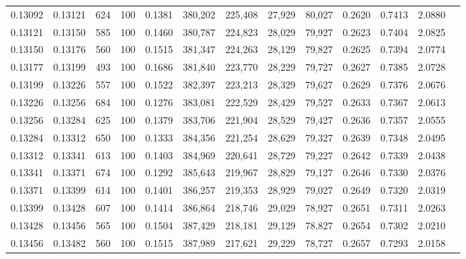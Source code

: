 \begin{tabular}{rrrrrrrrrrrrr}
0.13092 & 0.13121 &   624 & 100 &                                     0.1381 & 380,202 & 225,408 &  27,929 &  80,027 & 0.2620 & 0.7413 & 2.0880 \\
0.13121 & 0.13150 &   585 & 100 &                                     0.1460 & 380,787 & 224,823 &  28,029 &  79,927 & 0.2623 & 0.7404 & 2.0825 \\
0.13150 & 0.13176 &   560 & 100 &                                     0.1515 & 381,347 & 224,263 &  28,129 &  79,827 & 0.2625 & 0.7394 & 2.0774 \\
0.13177 & 0.13199 &   493 & 100 &                                     0.1686 & 381,840 & 223,770 &  28,229 &  79,727 & 0.2627 & 0.7385 & 2.0728 \\
0.13199 & 0.13226 &   557 & 100 &                                     0.1522 & 382,397 & 223,213 &  28,329 &  79,627 & 0.2629 & 0.7376 & 2.0676 \\
0.13226 & 0.13256 &   684 & 100 &                                     0.1276 & 383,081 & 222,529 &  28,429 &  79,527 & 0.2633 & 0.7367 & 2.0613 \\
0.13256 & 0.13284 &   625 & 100 &                                     0.1379 & 383,706 & 221,904 &  28,529 &  79,427 & 0.2636 & 0.7357 & 2.0555 \\
0.13284 & 0.13312 &   650 & 100 &                                     0.1333 & 384,356 & 221,254 &  28,629 &  79,327 & 0.2639 & 0.7348 & 2.0495 \\
0.13312 & 0.13341 &   613 & 100 &                                     0.1403 & 384,969 & 220,641 &  28,729 &  79,227 & 0.2642 & 0.7339 & 2.0438 \\
0.13341 & 0.13371 &   674 & 100 &                                     0.1292 & 385,643 & 219,967 &  28,829 &  79,127 & 0.2646 & 0.7330 & 2.0376 \\
0.13371 & 0.13399 &   614 & 100 &                                     0.1401 & 386,257 & 219,353 &  28,929 &  79,027 & 0.2649 & 0.7320 & 2.0319 \\
0.13399 & 0.13428 &   607 & 100 &                                     0.1414 & 386,864 & 218,746 &  29,029 &  78,927 & 0.2651 & 0.7311 & 2.0263 \\
0.13428 & 0.13456 &   565 & 100 &                                     0.1504 & 387,429 & 218,181 &  29,129 &  78,827 & 0.2654 & 0.7302 & 2.0210 \\
0.13456 & 0.13482 &   560 & 100 &                                     0.1515 & 387,989 & 217,621 &  29,229 &  78,727 & 0.2657 & 0.7293 & 2.0158 \\

\end{tabular}

